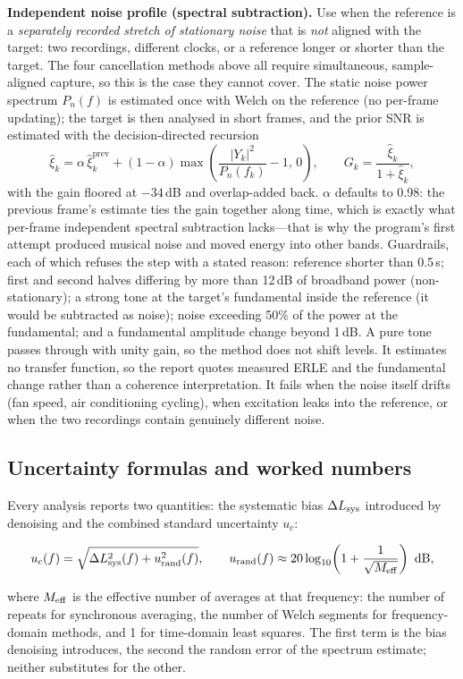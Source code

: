 \documentclass[UTF8,a4paper,12pt]{ctexart}
\begin{document}
\textbf{Independent noise profile (spectral subtraction).} Use when the reference is a \emph{separately recorded stretch of stationary noise} that is \emph{not} aligned with the target: two recordings, different clocks, or a reference longer or shorter than the target. The four cancellation methods above all require simultaneous, sample-aligned capture, so this is the case they cannot cover. The static noise power spectrum $P_n(f)$ is estimated once with Welch on the reference (no per-frame updating); the target is then analysed in short frames, and the prior SNR is estimated with the decision-directed recursion
\[
\hat\xi_k=\alpha\,\hat\xi_k^{\text{prev}}+(1-\alpha)\max\!\left(\frac{|Y_k|^2}{P_n(f_k)}-1,\,0\right),
\qquad
G_k=\frac{\hat\xi_k}{1+\hat\xi_k},
\]
with the gain floored at $-34$\,dB and overlap-added back. $\alpha$ defaults to 0.98: the previous frame's estimate ties the gain together along time, which is exactly what per-frame independent spectral subtraction lacks---that is why the program's first attempt produced musical noise and moved energy into other bands. Guardrails, each of which refuses the step with a stated reason: reference shorter than 0.5\,s; first and second halves differing by more than 12\,dB of broadband power (non-stationary); a strong tone at the target's fundamental inside the reference (it would be subtracted as noise); noise exceeding 50\% of the power at the fundamental; and a fundamental amplitude change beyond 1\,dB. A pure tone passes through with unity gain, so the method does not shift levels. It estimates no transfer function, so the report quotes measured ERLE and the fundamental change rather than a coherence interpretation. It fails when the noise itself drifts (fan speed, air conditioning cycling), when excitation leaks into the reference, or when the two recordings contain genuinely different noise.

\subsection{Uncertainty formulas and worked numbers}

Every analysis reports two quantities: the systematic bias $\Delta L_{\rm sys}$ introduced by denoising and the combined standard uncertainty $u_c$:

\[
u_c(f)=\sqrt{\Delta L_{\rm sys}^{2}(f)+u_{\rm rand}^{2}(f)},
\qquad
u_{\rm rand}(f)\approx 20\log_{10}\!\left(1+\frac{1}{\sqrt{M_{\rm eff}}}\right)\ {\rm dB},
\]

where $M_{\rm eff}$ is the effective number of averages at that frequency: the number of repeats for synchronous averaging, the number of Welch segments for frequency-domain methods, and 1 for time-domain least squares. The first term is the bias denoising introduces, the second the random error of the spectrum estimate; neither substitutes for the other.
\end{document}
